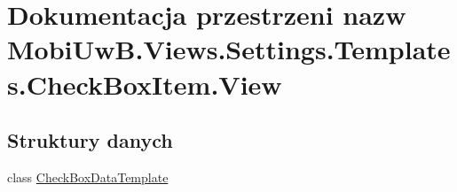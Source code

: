 \hypertarget{a00282}{}\section{Dokumentacja przestrzeni nazw Mobi\+Uw\+B.\+Views.\+Settings.\+Templates.\+Check\+Box\+Item.\+View}
\label{a00282}
\subsection*{Struktury danych}
\begin{DoxyCompactItemize}
\item 
class \hyperlink{a00009}{Check\+Box\+Data\+Template}
\end{DoxyCompactItemize}
